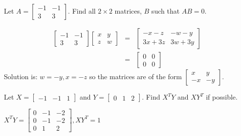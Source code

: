 \documentclass{ximera}
\begin{document}
\begin{problem}\label{prb:4.12} Let $A=\left[
\begin{array}{rr}
-1 & -1 \\
3 & 3
\end{array}
\right] $. Find all $2\times 2$ matrices, $B$
such that $AB=0.$
\begin{hint}
\begin{eqnarray*}
\left[
\begin{array}{rr}
-1 & -1 \\
3 & 3
\end{array}
\right] \left[
\begin{array}{cc}
x & y \\
z & w
\end{array}
\right]  &=&\left[
\begin{array}{cc}
-x-z & -w-y \\
3x+3z & 3w+3y
\end{array}
\right]  \\
&=&\left[
\begin{array}{cc}
0 & 0 \\
0 & 0
\end{array}
\right]
\end{eqnarray*}
Solution is: $ w=-y,x=-z $ so the
matrices are of the form $\left[
\begin{array}{rr}
x & y \\
-x & -y
\end{array}
\right].$
\end{hint}
\end{problem}


\begin{problem}\label{prb:4.13} Let $X=\left[
\begin{array}{rrr}
-1 & -1 & 1
\end{array}
\right] $ and $Y=\left[
\begin{array}{rrr}
0 & 1 & 2
\end{array}
\right] .$ Find $X^{T}Y$ and $XY^{T}$ if
possible.
\begin{hint}
$X^{T}Y = \left[ \begin{array}{rrr}
0 & -1 & -2 \\
0 & -1 & -2 \\
0 & 1 & 2
\end{array}
\right] , XY^{T} = 1$
\end{hint}
\end{problem}
\end{document}

